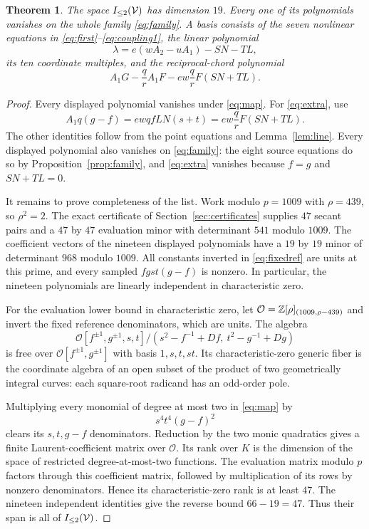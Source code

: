\documentclass[11pt,a4paper]{article}
\newtheorem{theorem}{Theorem}[section]
\begin{document}
\begin{theorem}\label{thm:quadrics}
The space $I_{\le2}(\mathcal V)$ has dimension $19$. Every one of its
polynomials vanishes on the whole family \eqref{eq:family}.
A basis consists of the seven nonlinear equations in
\eqref{eq:first}--\eqref{eq:coupling1}, the linear polynomial
\[
                         \lambda=e(wA_2-uA_1)-SN-TL,
\]
its ten coordinate multiples, and the reciprocal-chord polynomial
\begin{equation}\label{eq:extra}
 A_1G-\frac qr A_1F-ew\frac qr F(SN+TL).
\end{equation}
\end{theorem}
\begin{proof}
Every displayed polynomial vanishes under \eqref{eq:map}.
For \eqref{eq:extra}, use
\[
 A_1q(g-f)=ewqfLN(s+t)=ew\frac qr F(SN+TL).
\]
The other identities follow from the point equations and
Lemma~\ref{lem:line}. Every displayed polynomial also vanishes on
\eqref{eq:family}: the eight source equations do so by
Proposition~\ref{prop:family}, and \eqref{eq:extra} vanishes because
$f=g$ and $SN+TL=0$.

It remains to prove completeness of the list. Work modulo
$p=1009$ with $\rho=439$, so $\rho^2=2$. The exact certificate
of Section~\ref{sec:certificates} supplies $47$ secant pairs and a
$47$ by $47$ evaluation minor with determinant $541$ modulo $1009$.
The coefficient vectors of the nineteen displayed polynomials have
a $19$ by $19$ minor of determinant $968$ modulo $1009$.
All constants inverted in \eqref{eq:fixedref} are units at this prime,
and every sampled $fgst(g-f)$ is nonzero. In particular, the nineteen
polynomials are linearly independent in characteristic zero.

For the evaluation lower bound in characteristic zero, let
$\mathcal O=\mathbb Z[\rho]_{(1009,\rho-439)}$ and invert the fixed
reference denominators, which are units. The algebra
\[
 \mathcal O[f^{\pm1},g^{\pm1},s,t]\big/
       (s^2-f^{-1}+Df,\ t^2-g^{-1}+Dg)
\]
is free over $\mathcal O[f^{\pm1},g^{\pm1}]$ with basis
$1,s,t,st$. Its characteristic-zero generic fiber is the coordinate
algebra of an open subset of the product of two geometrically
integral curves: each square-root radicand has an odd-order pole.

Multiplying every monomial of degree at most two in
\eqref{eq:map} by
\[
                         s^4t^4(g-f)^2
\]
clears its $s,t,g-f$ denominators. Reduction by the two monic
quadratics gives a finite Laurent-coefficient matrix over
$\mathcal O$. Its rank over $K$ is the dimension of the space of
restricted degree-at-most-two functions. The evaluation matrix modulo
$p$ factors through this coefficient matrix, followed by multiplication
of its rows by nonzero denominators. Hence its characteristic-zero
rank is at least $47$. The nineteen independent identities give the
reverse bound $66-19=47$. Thus their span is all of
$I_{\le2}(\mathcal V)$.
\end{proof}
\end{document}
